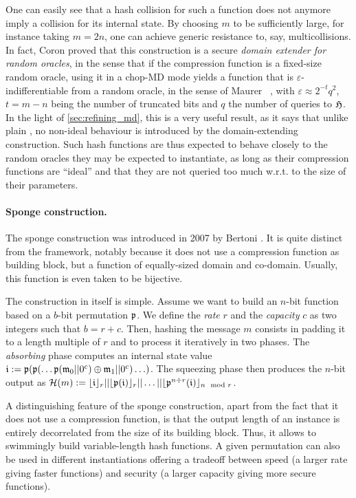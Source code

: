 One can easily see that a hash collision for such a function does not anymore imply a collision for its internal state. By choosing $m$ to be sufficiently large, for instance taking $m = 2n$,
one can achieve generic resistance to, say, multicollisions. In fact, Coron \etal proved that this construction is a secure \emph{domain extender for random oracles}, in the sense that
if the compression function is a fixed-size random oracle, using it in a chop-MD mode yields a function that is $\varepsilon$-indifferentiable from a random oracle, in the sense of Maurer \etal~\cite{DBLP:conf/tcc/MaurerRH04},
with $\varepsilon \approx 2^{-t}q^2$, $t = m - n$ being the number of truncated bits and $q$ the number of queries to $\operatorname{\mathfrak{H}}$. In the light of \autoref{sec:refining_md}, this is a very useful result, as it
says that unlike plain \merkdam, no non-ideal behaviour is introduced by the domain-extending construction. Such hash functions are thus expected to behave closely to the random oracles they may be expected to instantiate, as long as
their compression functions are ``ideal'' and that they are not queried too much w.r.t. to the size of their parameters.

\paragraph{Sponge construction.} The sponge construction was introduced in 2007 by Bertoni \etal \cite{SpongeFunctions}. It is quite distinct from the \merkdam framework, notably because it does not use a compression
function as building block, but a function of equally-sized domain and co-domain. Usually, this function is even taken to be bijective.

The construction in itself is simple. Assume we want to build an $n$-bit function based on a $b$-bit permutation $\operatorname{\mathfrak{p}}$. We define the \emph{rate} $r$ and the \emph{capacity} $c$ as two integers such that
$b = r + c$. Then, hashing the message $m$ consists in padding it to a length multiple of $r$ and to process it iteratively
in two phases. The \emph{absorbing} phase computes an internal state value $\mathfrak{i} := \operatorname{\mathfrak{p}}(\operatorname{\mathfrak{p}}(\ldots\operatorname{\mathfrak{p}}(\mathfrak{m}_0||0^c)\oplus\mathfrak{m}_1||0^c)\ldots)$. The squeezing phase then produces the
$n$-bit output as $\operatorname{\mathcal{H}}(m) := \lfloor\mathfrak{i}\rfloor_r||\lfloor\operatorname{\mathfrak{p}}(\mathfrak{i})\rfloor_r||\ldots||\lfloor\operatorname{\mathfrak{p}}^{n \div r}(\mathfrak{i})\rfloor_{n \mod r}$.

A distinguishing feature of the sponge construction, apart from the fact that it does not use a compression function, is that the output length of an instance is entirely decorrelated from the size of its building
block. Thus, it allows to swimmingly build variable-length hash functions. A given permutation can also be used in different instantiations offering a tradeoff between speed (a larger rate giving
faster functions) and security (a larger capacity giving more secure functions).

